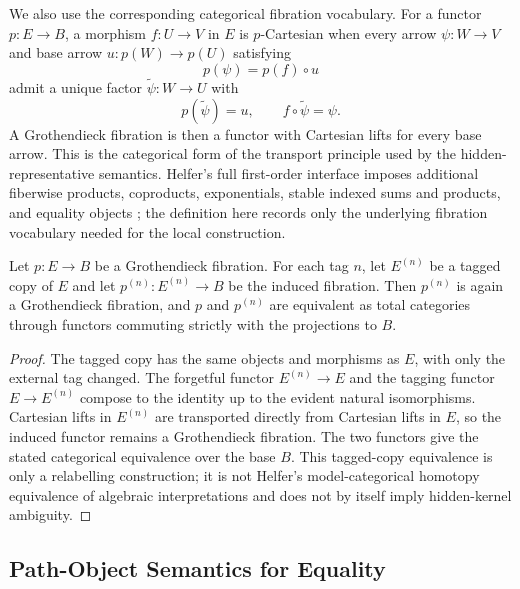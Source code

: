 We also use the corresponding categorical fibration vocabulary. For a functor
\(p:E\to B\), a morphism \(f:U\to V\) in \(E\) is \(p\)-Cartesian when every
arrow \(\psi:W\to V\) and base arrow \(u:p(W)\to p(U)\) satisfying
\[
  p(\psi)=p(f)\circ u
\]
admit a unique factor \(\widetilde\psi:W\to U\) with
\[
  p(\widetilde\psi)=u,
  \qquad
  f\circ\widetilde\psi=\psi.
\]
A Grothendieck fibration is then a functor
with Cartesian lifts for every base arrow. This is the categorical form of the
transport principle used by the hidden-representative semantics. Helfer's full
first-order interface imposes additional fiberwise products, coproducts,
exponentials, stable indexed sums and products, and equality objects
\cite[Definition~4.3]{helfer2019fol}; the definition here records only the
underlying fibration vocabulary needed for the local construction.

\begin{proposition}\label{prop:fibration-copy-equivalence}
  Let \(p:E\to B\) be a Grothendieck fibration. For each tag \(n\), let
  \(E^{(n)}\) be a tagged copy of \(E\) and let
  \(p^{(n)}:E^{(n)}\to B\) be the induced fibration. Then
  \(p^{(n)}\) is again a Grothendieck fibration, and \(p\) and \(p^{(n)}\) are
  equivalent as total categories through functors commuting strictly with the
  projections to \(B\).
\end{proposition}

\begin{proof}
  The tagged copy has the same objects and morphisms as \(E\), with only the
  external tag changed. The forgetful functor \(E^{(n)}\to E\) and the tagging
  functor \(E\to E^{(n)}\) compose to the identity up to the evident natural
  isomorphisms. Cartesian lifts in \(E^{(n)}\) are transported directly from
  Cartesian lifts in \(E\), so the induced functor remains a Grothendieck
  fibration. The two functors give the stated categorical equivalence over the
  base \(B\). This tagged-copy equivalence is only a relabelling construction;
  it is not Helfer's model-categorical homotopy equivalence of algebraic
  interpretations and does not by itself imply hidden-kernel ambiguity.
\end{proof}

\subsection{Path-Object Semantics for Equality}

